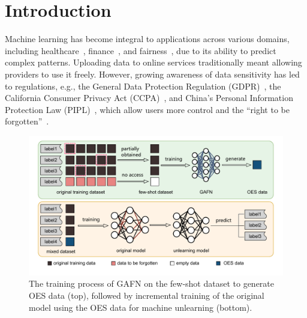 \documentclass[preprint,12pt]{elsarticle}
\begin{document}
\linenumbers

\section{Introduction}

Machine learning has become integral to applications across various domains, including healthcare~\cite{shailaja2018machine}, finance~\cite{dixon2020machine}, and fairness~\cite{xu2022assessing,xu2023disentangled}, due to its ability to predict complex patterns. Uploading data to online services traditionally meant allowing providers to use it freely. However, growing awareness of data sensitivity has led to regulations, e.g., the General Data Protection Regulation (GDPR)~\cite{voigt2017eu}, the California Consumer Privacy Act (CCPA)~\cite{goldman2020introduction}, and China’s Personal Information Protection Law (PIPL)~\cite{calzada2022citizens}, which allow users more control and the “right to be forgotten”~\cite{villaronga2018humans}.



\begin{figure}[t]  
    \centering
    \includegraphics[width=\textwidth]{pic1.pdf}
    \caption{The training process of GAFN on the few-shot dataset to generate OES data (top), followed by incremental training of the original model using the OES data for machine unlearning (bottom).}
    \label{fig_figure1}
\end{figure}
\end{document}
